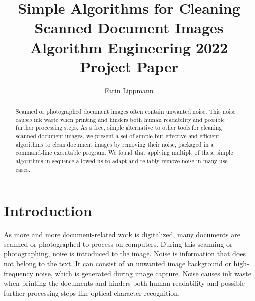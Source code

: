 \documentclass[sigconf]{acmart}
\begin{document}
\title[Simple Algorithms for Cleaning Scanned Document Images]{Simple Algorithms for Cleaning Scanned Document Images\\\large Algorithm Engineering 2022 Project Paper}


\author{Farin Lippmann}

\begin{abstract}
Scanned or photographed document images often contain unwanted noise. This noise causes ink waste when printing and hinders both human readability and possible further processing steps. As a free, simple alternative to other tools for cleaning scanned document images, we present a set of simple but effective and efficient algorithms to clean document images by removing their noise, packaged in a command-line executable program. We found that applying multiple of these simple algorithms in sequence allowed us to adapt and reliably remove noise in many use cases.
\end{abstract}



\maketitle

\let\thefootnote\relax{}


\section{Introduction}
As more and more document-related work is digitalized, many documents are scanned or photographed to process on computers. During this scanning or photographing, noise is introduced to the image. Noise is information that does not belong to the text. It can consist of an unwanted image background or high-frequency noise, which is generated during image capture. Noise causes ink waste when printing the documents and hinders both human readability and possible further processing steps like optical character recognition.
\end{document}
